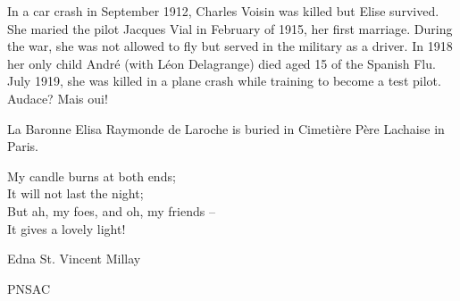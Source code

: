 In a car crash in September 1912, Charles Voisin was killed but
Elise survived. She maried the pilot Jacques Vial in February of
1915, her first marriage. During the war, she was not allowed to
fly but served in the military as a driver. In 1918 her only
child Andr\'{e} (with L\'{e}on Delagrange) died aged 15 of the Spanish
Flu. July 1919, she was killed in a plane crash while training to
become a test pilot. Audace? Mais oui!

La Baronne Elisa Raymonde de Laroche is buried in Cimeti\`{e}re
P\`{e}re Lachaise in Paris.

\vspace{10mm}

\begin{centering}
My candle burns at both ends;\\
It will not last the night;\\
But ah, my foes, and oh, my friends --\\
It gives a lovely light!\\
\vspace{2mm}
\begin{footnotesize}
Edna St. Vincent Millay
\end{footnotesize}

\end{centering}

\begin{footnotesize}
    \raggedleft PNSAC\\
\end{footnotesize}



